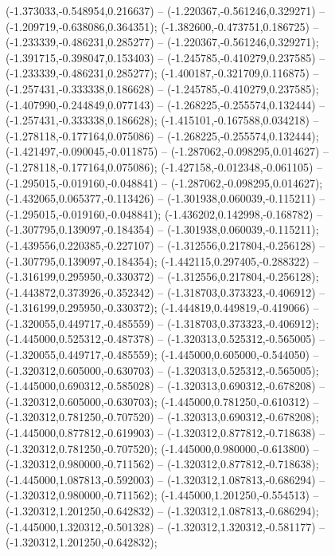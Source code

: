  (-1.373033,-0.548954,0.216637) -- (-1.220367,-0.561246,0.329271) -- (-1.209719,-0.638086,0.364351);
 (-1.382600,-0.473751,0.186725) -- (-1.233339,-0.486231,0.285277) -- (-1.220367,-0.561246,0.329271);
 (-1.391715,-0.398047,0.153403) -- (-1.245785,-0.410279,0.237585) -- (-1.233339,-0.486231,0.285277);
 (-1.400187,-0.321709,0.116875) -- (-1.257431,-0.333338,0.186628) -- (-1.245785,-0.410279,0.237585);
 (-1.407990,-0.244849,0.077143) -- (-1.268225,-0.255574,0.132444) -- (-1.257431,-0.333338,0.186628);
 (-1.415101,-0.167588,0.034218) -- (-1.278118,-0.177164,0.075086) -- (-1.268225,-0.255574,0.132444);
 (-1.421497,-0.090045,-0.011875) -- (-1.287062,-0.098295,0.014627) -- (-1.278118,-0.177164,0.075086);
 (-1.427158,-0.012348,-0.061105) -- (-1.295015,-0.019160,-0.048841) -- (-1.287062,-0.098295,0.014627);
 (-1.432065,0.065377,-0.113426) -- (-1.301938,0.060039,-0.115211) -- (-1.295015,-0.019160,-0.048841);
 (-1.436202,0.142998,-0.168782) -- (-1.307795,0.139097,-0.184354) -- (-1.301938,0.060039,-0.115211);
 (-1.439556,0.220385,-0.227107) -- (-1.312556,0.217804,-0.256128) -- (-1.307795,0.139097,-0.184354);
 (-1.442115,0.297405,-0.288322) -- (-1.316199,0.295950,-0.330372) -- (-1.312556,0.217804,-0.256128);
 (-1.443872,0.373926,-0.352342) -- (-1.318703,0.373323,-0.406912) -- (-1.316199,0.295950,-0.330372);
 (-1.444819,0.449819,-0.419066) -- (-1.320055,0.449717,-0.485559) -- (-1.318703,0.373323,-0.406912);
 (-1.445000,0.525312,-0.487378) -- (-1.320313,0.525312,-0.565005) -- (-1.320055,0.449717,-0.485559);
 (-1.445000,0.605000,-0.544050) -- (-1.320312,0.605000,-0.630703) -- (-1.320313,0.525312,-0.565005);
 (-1.445000,0.690312,-0.585028) -- (-1.320313,0.690312,-0.678208) -- (-1.320312,0.605000,-0.630703);
 (-1.445000,0.781250,-0.610312) -- (-1.320312,0.781250,-0.707520) -- (-1.320313,0.690312,-0.678208);
 (-1.445000,0.877812,-0.619903) -- (-1.320312,0.877812,-0.718638) -- (-1.320312,0.781250,-0.707520);
 (-1.445000,0.980000,-0.613800) -- (-1.320312,0.980000,-0.711562) -- (-1.320312,0.877812,-0.718638);
 (-1.445000,1.087813,-0.592003) -- (-1.320312,1.087813,-0.686294) -- (-1.320312,0.980000,-0.711562);
 (-1.445000,1.201250,-0.554513) -- (-1.320312,1.201250,-0.642832) -- (-1.320312,1.087813,-0.686294);
 (-1.445000,1.320312,-0.501328) -- (-1.320312,1.320312,-0.581177) -- (-1.320312,1.201250,-0.642832);
